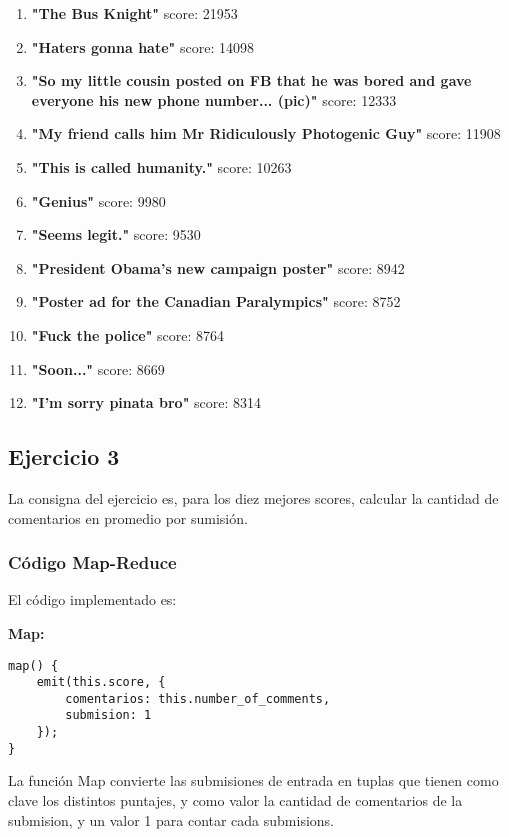 \begin{enumerate}

\item \textbf{"The Bus Knight"} score: 21953
\item \textbf{"Haters gonna hate"} score: 14098
\item  \textbf{"So my little cousin posted on FB that he was bored and gave everyone his new phone number... (pic)"} score: 12333
\item \textbf{"My friend calls him Mr Ridiculously Photogenic Guy"} score: 11908
\item \textbf{"This is called humanity."} score: 10263
\item \textbf{"Genius"} score: 9980
\item \textbf{"Seems legit."} score: 9530
\item \textbf{"President Obama's new campaign poster"} score: 8942
\item\textbf{"Poster ad for the Canadian Paralympics"} score: 8752
\item \textbf{"Fuck the police"} score: 8764
\item \textbf{"Soon..."} score: 8669
\item \textbf{"I'm sorry pinata bro"} score: 8314

\end{enumerate}

\subsection{Ejercicio 3}

La consigna del ejercicio es, para los diez mejores scores, calcular la cantidad de comentarios en promedio por sumisi\'on.

\subsubsection{C\'odigo Map-Reduce}

El c\'odigo implementado es:

\textbf{Map:}

\begin{lstlisting}
map() {
    emit(this.score, {
    	comentarios: this.number_of_comments,
    	submision: 1
    });
}
\end{lstlisting}

\vspace{2mm}

La funci\'on Map convierte las submisiones de entrada en tuplas que tienen como clave los distintos puntajes, y como valor la cantidad de comentarios de la submision, y un valor 1 para contar cada submisions.

